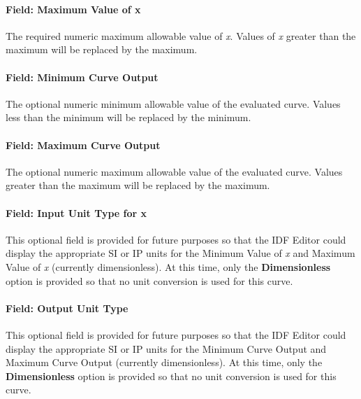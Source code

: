 \paragraph{Field: Maximum Value of x}\label{field-maximum-value-of-x-13}

The required numeric maximum allowable value of \emph{x}. Values of \emph{x} greater than the maximum will be replaced by the maximum.

\paragraph{Field: Minimum Curve Output}\label{field-minimum-curve-output-12}

The optional numeric minimum allowable value of the evaluated curve. Values less than the minimum will be replaced by the minimum.

\paragraph{Field: Maximum Curve Output}\label{field-maximum-curve-output-11}

The optional numeric maximum allowable value of the evaluated curve. Values greater than the maximum will be replaced by the maximum.

\paragraph{Field: Input Unit Type for x}\label{field-input-unit-type-for-x-12}

This optional field is provided for future purposes so that the IDF Editor could display the appropriate SI or IP units for the Minimum Value of \emph{x} and Maximum Value of \emph{x} (currently dimensionless). At this time, only the \textbf{Dimensionless} option is provided so that no unit conversion is used for this curve.

\paragraph{Field: Output Unit Type}\label{field-output-unit-type-11}

This optional field is provided for future purposes so that the IDF Editor could display the appropriate SI or IP units for the Minimum Curve Output and Maximum Curve Output (currently dimensionless). At this time, only the \textbf{Dimensionless} option is provided so that no unit conversion is used for this curve.


